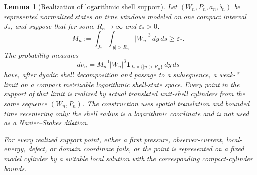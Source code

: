 \documentclass[11pt]{amsart}
\numberwithin{equation}{section}
\theoremstyle{plain}
\newtheorem{lemma}[lemma]{Lemma}
\theoremstyle{definition}
\theoremstyle{remark}
\begin{document}
\begin{lemma}[Realization of logarithmic shell support]
\label{lem:logarithmic-shell-support-realization}
Let \((W_n,P_n,a_n,b_n)\) be represented normalized states on time windows
modeled on one compact interval \(J_*\), and suppose that for some
\(R_n\to\infty\) and \(\varepsilon_*>0\),
\begin{equation}\label{eq:nonzero-spacetime-tail-mass}
 M_n:=\int_{J_*}\int_{|y|>R_n}|W_n|^3\,dy\,ds\ge\varepsilon_*.
\end{equation}
The probability measures
\[
 d\nu_n=M_n^{-1}|W_n|^3
 \mathbf 1_{J_*\times\{|y|>R_n\}}\,dy\,ds
\]
have, after dyadic shell decomposition and passage to a subsequence, a weak-*
limit on a compact metrizable logarithmic shell-state space.  Every point in
the support of that limit is realized by actual translated unit-shell
cylinders from the same sequence \((W_n,P_n)\).  The construction uses spatial
translation and bounded time recentering only; the shell radius is a
logarithmic coordinate and is not used as a Navier--Stokes dilation.

For every realized support point, either a first pressure, observer-current,
local-energy, defect, or domain coordinate fails, or the point is represented
on a fixed model cylinder by a suitable local solution with the corresponding
compact-cylinder bounds.
\end{lemma}
\end{document}
